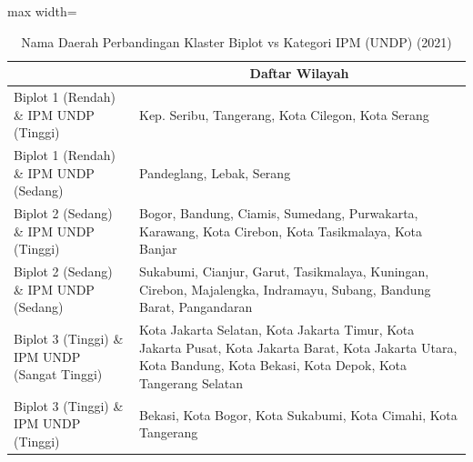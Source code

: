 \begin{table}[H]
\centering
\caption{Nama Daerah Perbandingan Klaster Biplot vs Kategori IPM (UNDP) (2021)} \label{tab:app1crossname2021}
\begin{adjustbox}{max width=\textwidth}
\begin{tabular}{|>{\centering\arraybackslash}p{4cm}|p{10cm}|}
\hline
\multicolumn{1}{|c|}{\textbf{Kategori}} & \multicolumn{1}{c|}{\textbf{Daftar Wilayah}} \\
\hline
Biplot 1 (Rendah) \& IPM UNDP (Tinggi) & Kep. Seribu, Tangerang, Kota Cilegon, Kota Serang \\
\hline
Biplot 1 (Rendah) \& IPM UNDP (Sedang) & Pandeglang, Lebak, Serang \\
\hline
Biplot 2 (Sedang) \& IPM UNDP (Tinggi) & Bogor, Bandung, Ciamis, Sumedang, Purwakarta, Karawang, Kota Cirebon, Kota Tasikmalaya, Kota Banjar \\
\hline
Biplot 2 (Sedang) \& IPM UNDP (Sedang) & Sukabumi, Cianjur, Garut, Tasikmalaya, Kuningan, Cirebon, Majalengka, Indramayu, Subang, Bandung Barat, Pangandaran \\
\hline
Biplot 3 (Tinggi) \& IPM UNDP (Sangat Tinggi) & Kota Jakarta Selatan, Kota Jakarta Timur, Kota Jakarta Pusat, Kota Jakarta Barat, Kota Jakarta Utara, Kota Bandung, Kota Bekasi, Kota Depok, Kota Tangerang Selatan \\
\hline
Biplot 3 (Tinggi) \& IPM UNDP (Tinggi) & Bekasi, Kota Bogor, Kota Sukabumi, Kota Cimahi, Kota Tangerang \\
\hline
\end{tabular}
\end{adjustbox}
\end{table}